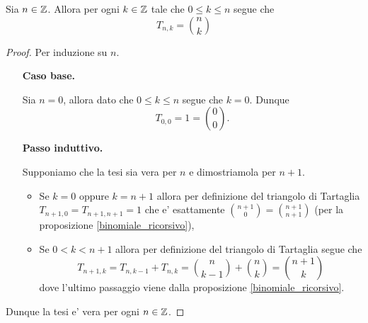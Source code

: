 \begin{proposition}
    Sia $n \in \mathbb{Z}$. Allora per ogni $k \in \mathbb{Z}$ tale che $0 \leq k \leq n$ segue che \begin{equation}
        T_{n,k} = \binom{n}{k}
    \end{equation}
\end{proposition}
\begin{proof}
    Per induzione su $n$.
    \begin{itemize}
        \item[\textbf{Caso base.}]

        Sia $n = 0$, allora dato che $0 \leq k \leq n$ segue che $k = 0$. Dunque
        \[
            T_{0, 0} = 1 = \binom{0}{0}.    
        \]
        \item[\textbf{Passo induttivo.}]
        
        Supponiamo che la tesi sia vera per $n$ e dimostriamola per $n+1$. 
        \begin{itemize}
            \item Se $k = 0$ oppure $k = n + 1$ allora per definizione del triangolo di Tartaglia $T_{n+1, 0} = T_{n+1, n+1} = 1$ che e' esattamente $\binom{n+1}{0} = \binom{n+1}{n+1}$ (per la proposizione \ref{binomiale_ricorsivo}),
            \item Se $0 < k < n+1$ allora per definizione del triangolo di Tartaglia segue che \[
                T_{n+1, k} = T_{n, k-1} + T_{n, k} = \binom{n}{k-1} + \binom{n}{k} = \binom{n+1}{k}    
            \] dove l'ultimo passaggio viene dalla proposizione \ref{binomiale_ricorsivo}.
        \end{itemize}
    \end{itemize}
    Dunque la tesi e' vera per ogni $n \in \mathbb{Z}$.
\end{proof}

